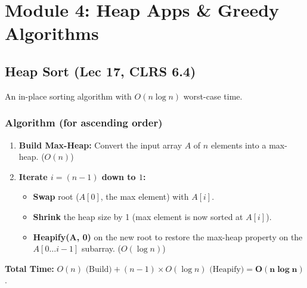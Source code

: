 
\section{Module 4: Heap Apps \& Greedy Algorithms}

\subsection{Heap Sort (Lec 17, CLRS 6.4)}
An in-place sorting algorithm with $O(n \log n)$ worst-case time.

\subsubsection{Algorithm (for ascending order)}
\begin{enumerate}
    \item \textbf{Build Max-Heap:} Convert the input array $A$ of $n$ elements into a max-heap. ($O(n)$)
    \item \textbf{Iterate $i = (n-1)$ down to $1$:}
    \begin{itemize}
        \item \textbf{Swap} root ($A[0]$, the max element) with $A[i]$.
        \item \textbf{Shrink} the heap size by 1 (max element is now sorted at $A[i]$).
        \item \textbf{Heapify(A, 0)} on the new root to restore the max-heap property on the $A[0 \dots i-1]$ subarray. ($O(\log n)$)
    \end{itemize}
\end{enumerate}
\textbf{Total Time:} $O(n) \text{ (Build)} + (n-1) \times O(\log n) \text{ (Heapify)} = \mathbf{O(n \log n)}$.

